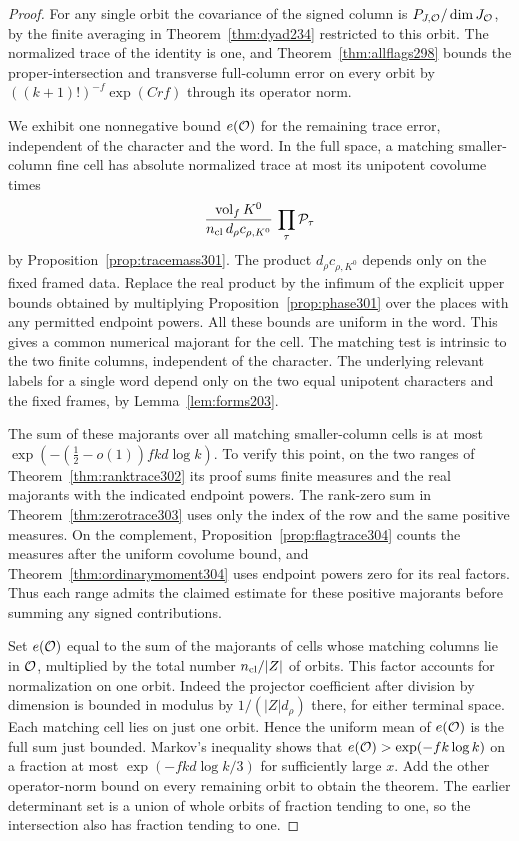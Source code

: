 \documentclass[a4paper,11pt]{article}
\theoremstyle{definition}
\theoremstyle{remark}
\numberwithin{equation}{section}
\begin{document}
\begin{proof}
For any single orbit the covariance of the signed column
is \(P_{J,{\cal O}}/\dim J_{\cal O}\), by the finite averaging
in Theorem~\ref{thm:dyad234} restricted to this orbit.
The normalized trace of the identity is one, and
Theorem~\ref{thm:allflags298} bounds the proper-intersection
and transverse full-column error on every orbit by
\(((k+1)!)^{-f}\exp(Crf)\) through its operator norm.

We exhibit one nonnegative bound \(e({\cal O})\) for the
remaining trace error, independent of the character and
the word. In the full space, a matching smaller-column
fine cell has absolute normalized trace at most its
unipotent covolume times
\[
   \frac{\operatorname{vol}_f K^0}
          {n_{\rm cl}\,d_\rho c_{\rho,K^0}}\,
                      \prod_\tau{\cal P}_\tau
\]
by Proposition~\ref{prop:tracemass301}. The product
\(d_\rho c_{\rho,K^0}\) depends only on the fixed framed
data. Replace the real product by the infimum of the
explicit upper bounds obtained by multiplying
Proposition~\ref{prop:phase301} over the places with any
permitted endpoint powers. All these bounds are uniform
in the word. This gives a common numerical majorant
for the cell. The matching test is intrinsic to the two
finite columns, independent of the character. The
underlying relevant labels for a single word depend
only on the two equal unipotent characters and the
fixed frames, by Lemma~\ref{lem:forms203}.

The sum of these majorants over all matching smaller-column
cells is at most \(\exp(-(\tfrac12-o(1))fkd\log k)\).
To verify this point, on the two ranges of
Theorem~\ref{thm:ranktrace302} its proof sums finite
measures and the real majorants with the indicated
endpoint powers. The rank-zero sum in
Theorem~\ref{thm:zerotrace303} uses only the index of
the row and the same positive measures. On the complement,
Proposition~\ref{prop:flagtrace304} counts the measures
after the uniform covolume bound, and
Theorem~\ref{thm:ordinarymoment304} uses endpoint powers
zero for its real factors. Thus each range admits the
claimed estimate for these positive majorants before
summing any signed contributions.

Set \(e({\cal O})\) equal to the sum of the majorants of
cells whose matching columns lie in \({\cal O}\), multiplied
by the total number \(n_{\rm cl}/|Z|\) of orbits. This
factor accounts for normalization on one orbit. Indeed
the projector coefficient after division by dimension
is bounded in modulus by \(1/(|Z|d_\rho)\) there, for
either terminal space. Each matching cell lies on just one
orbit. Hence the uniform mean of \(e({\cal O})\) is the
full sum just bounded. Markov's inequality shows that
\(e({\cal O})>\exp(-fk\log k)\) on a fraction at most
\(\exp(-fkd\log k/3)\) for sufficiently large \(x\).
Add the other operator-norm bound on every remaining
orbit to obtain the theorem. The earlier determinant
set is a union of whole orbits of fraction tending to one,
so the intersection also has fraction tending to one.
\end{proof}
\end{document}
